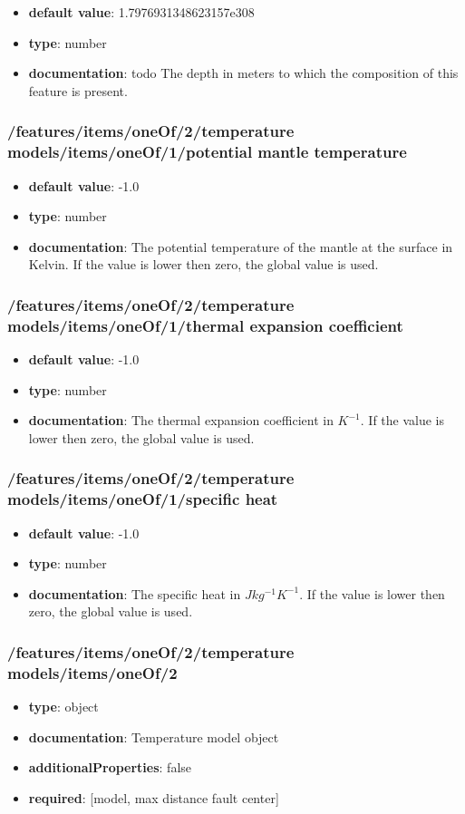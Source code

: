 \begin{itemize}\item {\bf default value}: 1.7976931348623157e308
\item {\bf type}: number
\item {\bf documentation}: todo The depth in meters to which the composition of this feature is present.
\end{itemize}\subsubsection{/features/items/oneOf/2/temperature models/items/oneOf/1/potential mantle temperature}
\begin{itemize}\item {\bf default value}: -1.0
\item {\bf type}: number
\item {\bf documentation}: The potential temperature of the mantle at the surface in Kelvin. If the value is lower then zero, the global value is used.
\end{itemize}\subsubsection{/features/items/oneOf/2/temperature models/items/oneOf/1/thermal expansion coefficient}
\begin{itemize}\item {\bf default value}: -1.0
\item {\bf type}: number
\item {\bf documentation}: The thermal expansion coefficient in $K^{-1}$. If the value is lower then zero, the global value is used.
\end{itemize}\subsubsection{/features/items/oneOf/2/temperature models/items/oneOf/1/specific heat}
\begin{itemize}\item {\bf default value}: -1.0
\item {\bf type}: number
\item {\bf documentation}: The specific heat in $J kg^{-1} K^{-1}$. If the value is lower then zero, the global value is used.
\end{itemize}\subsubsection{/features/items/oneOf/2/temperature models/items/oneOf/2}
\begin{itemize}\item {\bf type}: object
\item {\bf documentation}: Temperature model object
\item {\bf additionalProperties}: false
\item {\bf required}: [model, max distance fault center]\end{itemize}
